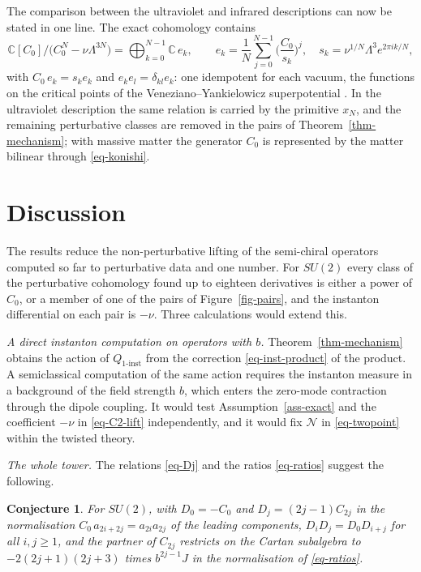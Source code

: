 \documentclass[11pt]{article}
\numberwithin{equation}{section}
\numberwithin{figure}{section}
\numberwithin{table}{section}
\newtheorem{conjecture}[theorem]{Conjecture}
\theoremstyle{definition}
\newcommand{\Qi}{Q_{1\text{-}\mathrm{inst}}}
\begin{document}
The comparison between the ultraviolet and infrared descriptions can now be stated in one line. The exact cohomology contains
\begin{equation}\label{eq-idempotents}
\mathbb C[C_0]\big/\big(C_0^N-\nu\Lambda^{3N}\big)=\bigoplus_{k=0}^{N-1}\mathbb C\,e_k,\qquad
e_k=\frac1N\sum_{j=0}^{N-1}\Big(\frac{C_0}{s_k}\Big)^j,\quad s_k=\nu^{1/N}\Lambda^3e^{2\pi ik/N},
\end{equation}
with $C_0\,e_k=s_ke_k$ and $e_ke_l=\delta_{kl}e_k$: one idempotent for each vacuum, the functions on the critical points of the Veneziano--Yankielowicz superpotential \cite{VY}. In the ultraviolet description the same relation is carried by the primitive $x_N$, and the remaining perturbative classes are removed in the pairs of Theorem~\ref{thm-mechanism}; with massive matter the generator $C_0$ is represented by the matter bilinear through \eqref{eq-konishi}.

\section{Discussion}\label{sec-discussion}

The results reduce the non-perturbative lifting of the semi-chiral operators computed so far to perturbative data and one number. For $SU(2)$ every class of the perturbative cohomology found up to eighteen derivatives is either a power of $C_0$, or a member of one of the pairs of Figure~\ref{fig-pairs}, and the instanton differential on each pair is $-\nu$. Three calculations would extend this.

\emph{A direct instanton computation on operators with $b$.} Theorem~\ref{thm-mechanism} obtains the action of $\Qi$ from the correction \eqref{eq-inst-product} of the product. A semiclassical computation of the same action requires the instanton measure in a background of the field strength $b$, which enters the zero-mode contraction through the dipole coupling. It would test Assumption~\ref{ass-exact} and the coefficient $-\nu$ in \eqref{eq-C2-lift} independently, and it would fix $\mathcal N$ in \eqref{eq-twopoint} within the twisted theory.

\emph{The whole tower.} The relations \eqref{eq-Dj} and the ratios \eqref{eq-ratios} suggest the following.

\begin{conjecture}\label{conj-tower}
For $SU(2)$, with $D_0=-C_0$ and $D_j=(2j-1)C_{2j}$ in the normalisation $C_0\,a_{2i+2j}=a_{2i}a_{2j}$ of the leading components, $D_iD_j=D_0D_{i+j}$ for all $i,j\ge1$, and the partner of $C_{2j}$ restricts on the Cartan subalgebra to $-2(2j+1)(2j+3)$ times $b^{2j-1}J$ in the normalisation of \eqref{eq-ratios}.
\end{conjecture}
\end{document}
